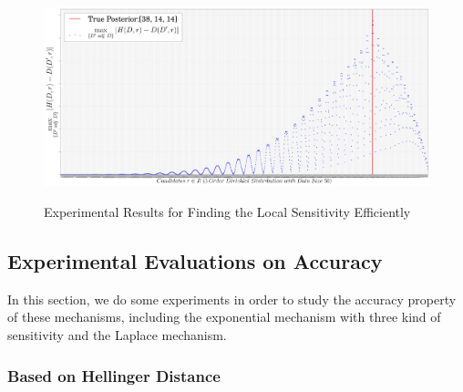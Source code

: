  \begin{figure}[h]
\centering
\includegraphics[width=1.0\textwidth]{efficiency}
\label{fig_efficiency}
\caption{Experimental Results for Finding the Local Sensitivity Efficiently}
\end{figure}

\subsection{Experimental Evaluations on Accuracy}
In this section, we do some experiments in order to study the accuracy property of these mechanisms, including the exponential mechanism with three kind of sensitivity and the Laplace mechanism.

\subsubsection{Based on Hellinger Distance}
\label{subsec_accuracy_hellinger}

